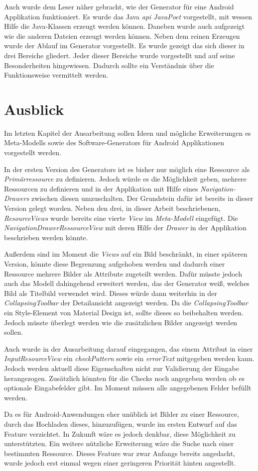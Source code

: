Auch wurde dem Leser näher gebracht, wie der Generator für eine Android Applikation funktioniert. Es wurde das Java \textit{\acf{api}} \textit{JavaPoet} vorgestellt, mit wessen Hilfe die Java-Klassen erzeugt werden können. Daneben wurde auch aufgezeigt wie die anderen Dateien erzeugt werden können. 
Neben dem reinen Erzeugen wurde der Ablauf im Generator vorgestellt. Es wurde gezeigt das sich dieser in drei Bereiche gliedert.
Jeder dieser Bereiche wurde vorgestellt und auf seine Besonderheiten hingewiesen. Dadurch sollte ein Verständnis über die Funktionsweise vermittelt werden.  

\section{Ausblick}

Im letzten Kapitel der Ausarbeitung sollen Ideen und mögliche Erweiterungen es Meta-Modells sowie des Software-Generators für Android Applikationen vorgestellt werden.

In der ersten Version des Generators ist es bisher nur möglich eine Ressource als \textit{Primärressource} zu definieren. Jedoch würde es die Möglichkeit geben, mehrere Ressourcen zu definieren und in der Applikation mit Hilfe eines \textit{Navigation-Drawers} zwischen diesen umzuschalten. Der Grundstein dafür ist bereits in dieser Version gelegt worden. Neben den drei, in dieser Arbeit beschriebenen, \textit{ResourceViews} wurde bereits eine vierte \textit{View} im \textit{Meta-Modell} eingefügt. Die \textit{NavigationDrawerRessourceView} mit deren Hilfe der \textit{Drawer} in der Applikation beschrieben werden könnte.

Außerdem sind im Moment die \textit{Views} auf ein Bild beschränkt, in einer späteren Version,  könnte diese Begrenzung  aufgehoben werden und dadurch einer Ressource mehrere Bilder als Attribute zugeteilt werden. Dafür müsste jedoch auch das Modell dahingehend erweitert werden, das der Generator weiß, welches Bild als Titelbild verwendet wird. Dieses würde dann weiterhin in der \textit{CollapsingToolbar} der Detailansicht angezeigt werden. Da die \textit{CollapsingToolbar} ein Style-Element von Material Design ist, sollte dieses so beibehalten werden. Jedoch müsste überlegt werden wie die zusätzlichen Bilder angezeigt werden sollen.

Auch wurde in der Ausarbeitung darauf eingegangen, das einem Attribut in einer \textit{InputResourceView} ein \textit{checkPattern} sowie ein \textit{errorText} mitgegeben werden kann. Jedoch werden aktuell diese Eigenschaften nicht zur Validierung der Eingabe herangezogen. Zusätzlich könnten für die Checks noch angegeben werden ob es optionale Eingabefelder gibt. Im Moment müssen alle angegebenen Felder befüllt werden.

\newpage

Da es für Android-Anwendungen eher unüblich ist Bilder zu einer Ressource, durch das Hochladen dieses, hinzuzufügen, wurde im ersten Entwurf auf das Feature verzichtet. In Zukunft wäre es jedoch denkbar, diese Möglichkeit zu unterstützten. 
Ein weitere nützliche Erweiterung wäre die Suche nach einer bestimmten Ressource. Dieses Feature war zwar Anfangs bereits angedacht, wurde jedoch erst einmal wegen einer geringeren Priorität hinten angestellt.
